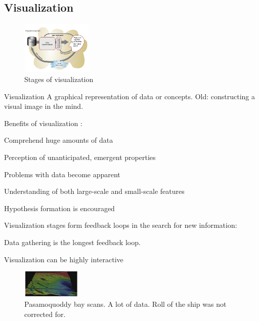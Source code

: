 \begin{mdframed}\begin{multicols}{2}
\subsection{Visualization}
        \begin{figure}[H]
            \centering
            \includegraphics[width=0.3\textwidth]{stages.png}
            \caption{Stages of visualization}
        \end{figure}
\begin{compactdesc}
    \item[Visualization] A graphical representation of data or concepts. Old:
        constructing a visual image in the mind.
    \item[Benefits of visualization]:
        \begin{compactenum}
        \item Comprehend huge amounts of data
        \item Perception of unanticipated, emergent properties
        \item Problems with data become apparent
        \item Understanding of both large-scale and small-scale features
        \item Hypothesis formation is encouraged
        \end{compactenum}
    \item[Visualization stages] form feedback loops in the search for new
        information:
    \item[Data gathering] is the longest feedback loop.
    \item[Visualization] can be highly interactive

        \begin{figure}[H]
            \centering
            \includegraphics[width=0.25\textwidth]{pasamoquoddy_vis.png}
            \caption{Pasamoquoddy bay scans. A lot of data. Roll of the ship
            was not corrected for.}
        \end{figure}


\end{compactdesc}
\end{multicols}\end{mdframed}

